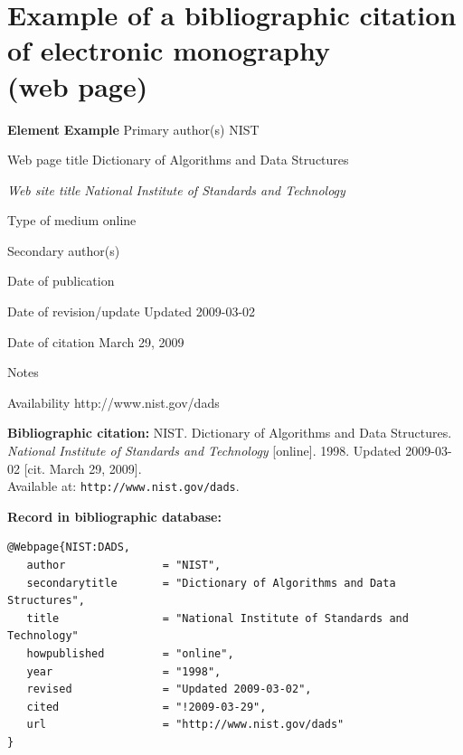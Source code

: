 \section*{Example of a bibliographic citation of electronic monography \\
(web page)}
\label{pr-webpage}
\begin{tabbing}
\zarazky
\textbf{Element} \> \textbf{Example} \odradkovani
Primary author(s) \>
NIST

\odradkovani
Web page title \>
Dictionary of Algorithms and Data Structures

\odradkovani
{\em Web site title} \>
{\em National Institute of Standards and Technology}

\odradkovani
Type of medium \>
online

\odradkovani
Secondary author(s)\footnotemark[1] \>

\odradkovani
Date of publication 

\odradkovani
Date of revision/update \>
Updated 2009-03-02

\odradkovani
Date of citation \>
March 29, 2009

\odradkovani
Notes\footnotemark[2] \>

\odradkovani
Availability \>
http://www.nist.gov/dads

\odradkovani
\end{tabbing}

\noindent \textbf{Bibliographic citation:} \odradkovani
NIST. Dictionary of Algorithms and Data Structures. {\em National Institute of Standards and Technology} [online]. 1998. Updated 2009-03-02 [cit. March 29, 2009]. \\
Available at: {\tt http://www.nist.gov/dads}.

\bigskip \bigskip
\noindent \textbf{Record in bibliographic database:}
\vspace{-0.5em}
\begin{verbatim}
@Webpage{NIST:DADS,
   author               = "NIST",
   secondarytitle       = "Dictionary of Algorithms and Data Structures",
   title                = "National Institute of Standards and Technology"
   howpublished         = "online",
   year                 = "1998",
   revised              = "Updated 2009-03-02",
   cited                = "!2009-03-29",
   url                  = "http://www.nist.gov/dads"
}
\end{verbatim}


